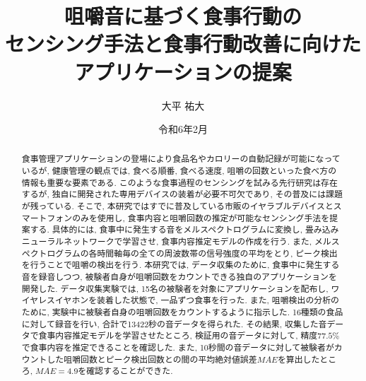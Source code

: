 \documentclass[a4paper,12pt]{jreport}
\title{咀嚼音に基づく食事行動の\\センシング手法と食事行動改善に向けた\\アプリケーションの提案}
\author{大平 祐大}
\date{令和6年2月}
\begin{document}
\maketitle
\thispagestyle{empty}

\begin{abstract}
    食事管理アプリケーションの登場により食品名やカロリーの自動記録が可能になっているが, 健康管理の観点では, 食べる順番, 食べる速度, 咀嚼の回数といった食べ方の情報も重要な要素である. このような食事過程のセンシングを試みる先行研究は存在するが, 独自に開発された専用デバイスの装着が必要不可欠であり, その普及には課題が残っている. そこで, 本研究ではすでに普及している市販のイヤラブルデバイスとスマートフォンのみを使用し, 食事内容と咀嚼回数の推定が可能なセンシング手法を提案する. 具体的には, 食事中に発生する音をメルスペクトログラムに変換し, 畳み込みニューラルネットワークで学習させ, 食事内容推定モデルの作成を行う. また, メルスペクトログラムの各時間軸毎の全ての周波数帯の信号強度の平均をとり, ピーク検出を行うことで咀嚼の検出を行う. 本研究では, データ収集のために, 食事中に発生する音を録音しつつ, 被験者自身が咀嚼回数をカウントできる独自のアプリケーションを開発した. データ収集実験では, 15名の被験者を対象にアプリケーションを配布し, ワイヤレスイヤホンを装着した状態で, 一品ずつ食事を行った. また, 咀嚼検出の分析のために, 実験中に被験者自身の咀嚼回数をカウントするように指示した. 16種類の食品に対して録音を行い, 合計で13422秒の音データを得られた. その結果, 収集した音データで食事内容推定モデルを学習させたところ, 検証用の音データに対して, 精度$77.5\%$で食事内容を推定できることを確認した. また, 10秒間の音データに対して被験者がカウントした咀嚼回数とピーク検出回数との間の平均絶対値誤差$MAE$を算出したところ, $MAE = 4.9$を確認することができた.
\end{abstract}

\setcounter{page}{0}
\tableofcontents










\end{document}
